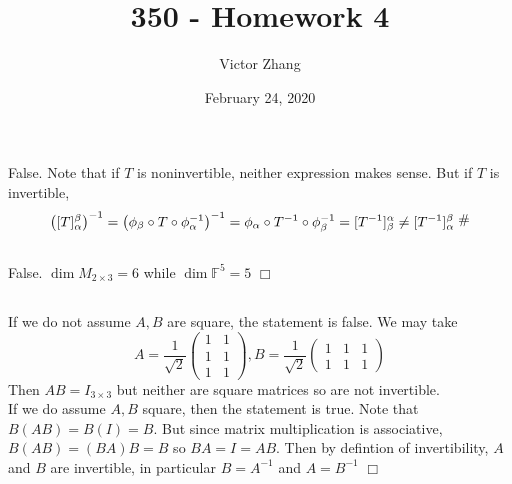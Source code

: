 \documentclass{article}
\title{350 - Homework 4}
\author{Victor Zhang}
\date{February 24, 2020}
\newcommand{\contra}{\raisebox{\depth}{\#}}
\begin{document}
\maketitle

\section{}
\subsection{}
False. Note that if $T$ is noninvertible, neither expression makes sense. But if $T$ is invertible,
$$\left([T]_\alpha^\beta\right)^{-1} = \left( \phi_\beta \circ T \circ \phi_\alpha^{-1} \right)^{-1} = \phi_\alpha \circ T^{-1} \circ \phi_\beta^{-1} = [T^{-1}]_\beta^\alpha \neq [T^{-1}]_\alpha^\beta \; \contra$$

\subsection{}
False. $\dim M_{2\times 3} = 6$ while $\dim \mathbb{F}^5 = 5$ $\Box$

\subsection{}
If we do not assume $A,B$ are square, the statement is false. We may take
$$ A= \frac{1}{\sqrt{2}}\left(\begin{matrix}1&1\\1&1\\1&1\end{matrix}\right), B = \frac{1}{\sqrt{2}}\left(\begin{matrix}1&1&1\\1&1&1\end{matrix}\right) $$
Then $AB = I_{3 \times 3}$ but neither are square matrices so are not invertible.\\
If we do assume $A,B$ square, then the statement is true. Note that $B(AB) = B(I) = B$. But since matrix multiplication is associative, $B(AB) = (BA)B = B$ so $BA = I = AB$. Then by defintion of invertibility, $A$ and $B$ are invertible, in particular $B = A^{-1}$ and $A = B^{-1}$ $\Box$
\end{document}

